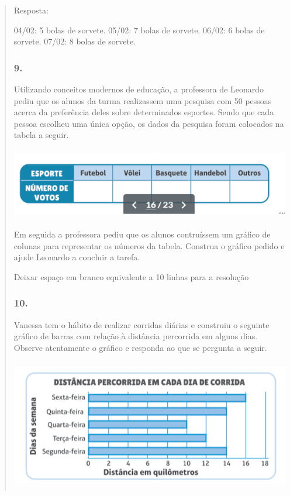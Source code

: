 \begin{enumerate}
\begin{escolha}
\begin{enumerate}
\begin{itemize}
\begin{itemize}
\begin{escolha}
\begin{quote}
\begin{escolha}
{Resposta:

04/02: 5 bolas de sorvete.
05/02: 7 bolas de sorvete.
06/02: 6 bolas de sorvete.
07/02: 8 bolas de sorvete.

\subsubsection{9.}\label{section-99}

Utilizando conceitos modernos de educação, a professora de Leonardo
pediu que os alunos da turma realizassem uma pesquisa com 50 pessoas acerca da
preferência deles sobre determinados esportes. Sendo que cada pessoa
escolheu uma única opção, os dados da pesquisa foram colocados na tabela
a seguir.

\includegraphics[width=5.39213in,height=1.22511in]{media/image102.png}

Em seguida a professora pediu que os alunos contruíssem um gráfico de
colunas para representar os números da tabela. Construa o gráfico pedido
e ajude Leonardo a concluir a tarefa.

Deixar espaço em branco equivalente a 10 linhas para a resolução

\subsubsection{10.}\label{section-100}

Vanessa tem o hábito de realizar corridas diárias e construiu o seguinte
gráfico de barras com relação à distância percorrida em alguns dias. Observe atentamente o gráfico e responda ao que se pergunta a seguir.

\includegraphics[width=5.22545in,height=2.25853in]{media/image103.png}

}
\end{escolha}
\end{quote}
\end{escolha}
\end{itemize}
\end{itemize}
\end{enumerate}
\end{escolha}
\end{enumerate}
